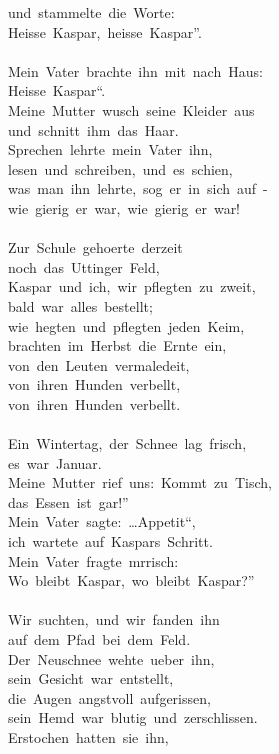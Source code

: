 \documentclass[]{book}
\begin{document}
und~stammelte~die~Worte:\\
Heisse~Kaspar,~heisse~Kaspar''.\\
~\\
Mein~Vater~brachte~ihn~mit~nach~Haus:\\
Heisse~Kaspar``.\\
Meine~Mutter~wusch~seine~Kleider~aus\\
und~schnitt~ihm~das~Haar.\\
Sprechen~lehrte~mein~Vater~ihn,\\
lesen~und~schreiben,~und~es~schien,\\
was~man~ihn~lehrte,~sog~er~in~sich~auf~-\\
wie~gierig~er~war,~wie~gierig~er~war!\\
~\\
Zur~Schule~gehoerte~derzeit\\
noch~das~Uttinger~Feld,\\
Kaspar~und~ich,~wir~pflegten~zu~zweit,\\
bald~war~alles~bestellt;\\
wie~hegten~und~pflegten~jeden~Keim,\\
brachten~im~Herbst~die~Ernte~ein,\\
von~den~Leuten~vermaledeit,\\
von~ihren~Hunden~verbellt,\\
von~ihren~Hunden~verbellt.\\
~\\
Ein~Wintertag,~der~Schnee~lag~frisch,\\
es~war~Januar.\\
Meine~Mutter~rief~uns:~Kommt~zu~Tisch,\\
das~Essen~ist~gar!''\\
Mein~Vater~sagte:~\ldots Appetit``,\\
ich~wartete~auf~Kaspars~Schritt.\\
Mein~Vater~fragte~mrrisch:\\
Wo~bleibt~Kaspar,~wo~bleibt~Kaspar?''\\
~\\
Wir~suchten,~und~wir~fanden~ihn\\
auf~dem~Pfad~bei~dem~Feld.\\
Der~Neuschnee~wehte~ueber~ihn,\\
sein~Gesicht~war~entstellt,\\
die~Augen~angstvoll~aufgerissen,\\
sein~Hemd~war~blutig~und~zerschlissen.\\
Erstochen~hatten~sie~ihn,\\
\end{document}
